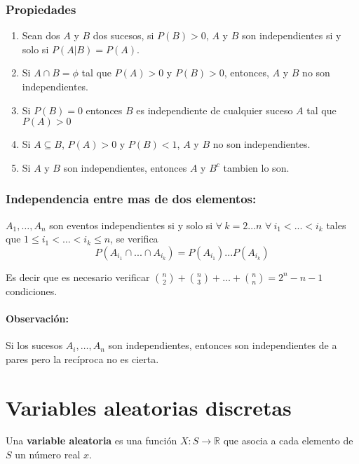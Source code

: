 \subsubsection{Propiedades}
\begin{enumerate}
\item Sean dos $A$ y $B$ dos sucesos, si $P(B) > 0$, $A$ y $B$ son independientes si y solo si $P(A|B) = P(A)$.

\item Si $A\cap B = \phi$ tal que $P(A) > 0$ y $P(B) > 0$, entonces, $A$ y $B$ no son independientes.

\item Si $P(B) = 0$ entonces $B$ es independiente de cualquier suceso $A$ tal que $P(A) > 0$

\item Si $A\subseteq B$, $P(A) > 0$ y $P(B) < 1$, $A$ y $B$ no son independientes.

\item Si $A$ y $B$ son independientes, entonces $A$ y $B^c$ tambien lo son.

\end{enumerate}

\subsubsection{Independencia entre mas de dos elementos:}
$A_1,\dots,A_n$ son eventos independientes si y solo si $\forall~k = 2\dots n$ $\forall~i_1 < ... < i_k$ tales que $1 \leq i_1 < \dots < i_k \leq n$, se verifica $$P(A_{i_1}\cap ...\cap A_{i_k}) = P(A_{i_1})...P(A_{i_k})$$

Es decir que es necesario verificar $\binom{n}{2} + \binom{n}{3} + \dots + \binom{n}{n} = 2^n -n -1$ condiciones.

\paragraph{Observación:} Si los sucesos $A_i,\dots,A_n$ son independientes, entonces son independientes de a pares pero la recíproca no es cierta.


\section{Variables aleatorias discretas}

Una \textbf{variable aleatoria} es una función $X : S\rightarrow\mathbb{R}$ que asocia a cada elemento de $S$ un número real $x$.

